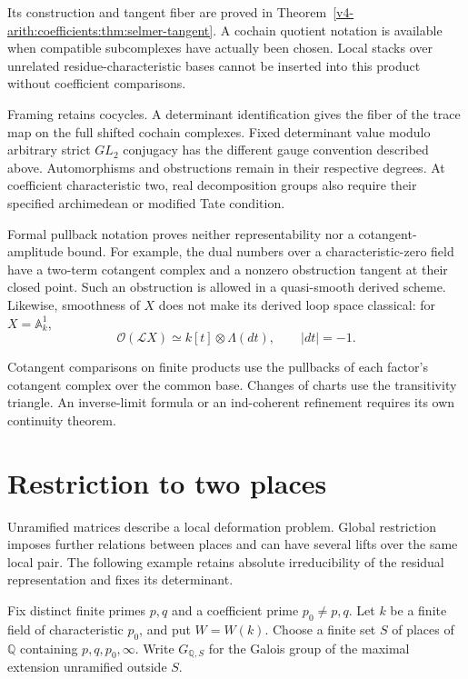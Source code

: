 Its construction and tangent fiber are proved in
Theorem~\ref{v4-arith:coefficients:thm:selmer-tangent}.
A cochain quotient notation is available when compatible
subcomplexes have actually been chosen.
Local stacks over unrelated residue-characteristic bases cannot
be inserted into this product without coefficient comparisons.

Framing retains cocycles. A determinant identification gives
the fiber of the trace map on the full shifted cochain complexes.
Fixed determinant value modulo arbitrary strict \(GL_2\)
conjugacy has the different gauge convention described above.
Automorphisms and obstructions remain in their respective
degrees. At coefficient characteristic two, real decomposition
groups also require their specified archimedean or modified
Tate condition.

Formal pullback notation proves neither representability nor
a cotangent-amplitude bound. For example, the dual numbers
over a characteristic-zero field have a two-term cotangent
complex and a nonzero obstruction tangent at their closed point.
Such an obstruction is allowed in a quasi-smooth derived scheme.
Likewise, smoothness of \(X\) does not make its derived loop
space classical: for \(X=\mathbb A^1_k\),
\[
 \mathcal O(\mathcal LX)
   \simeq k[t]\otimes\Lambda(dt),
 \qquad |dt|=-1.
\]

Cotangent comparisons on finite products use the pullbacks of
each factor's cotangent complex over the common base.
Changes of charts use the transitivity triangle.
An inverse-limit formula or an ind-coherent refinement requires
its own continuity theorem.


\section{Restriction to two places}
\label{v4-arith:ic:two-places}

Unramified matrices describe a local deformation problem.
Global restriction imposes further relations between places and
can have several lifts over the same local pair. The following
example retains absolute irreducibility of the residual
representation and fixes its determinant.


Fix distinct finite primes $p,q$ and a coefficient prime
$p_0\ne p,q$. Let $k$ be a finite field of characteristic $p_0$,
and put $W=W(k)$. Choose a finite set $S$ of places of $\mathbb Q$
containing $p,q,p_0,\infty$. Write $G_{\mathbb Q,S}$ for the Galois
group of the maximal extension unramified outside $S$.

